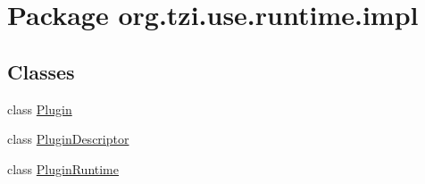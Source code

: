 \hypertarget{namespaceorg_1_1tzi_1_1use_1_1runtime_1_1impl}{\section{Package org.\-tzi.\-use.\-runtime.\-impl}
\label{namespaceorg_1_1tzi_1_1use_1_1runtime_1_1impl}
}
\subsection*{Classes}
\begin{DoxyCompactItemize}
\item 
class \hyperlink{classorg_1_1tzi_1_1use_1_1runtime_1_1impl_1_1_plugin}{Plugin}
\item 
class \hyperlink{classorg_1_1tzi_1_1use_1_1runtime_1_1impl_1_1_plugin_descriptor}{Plugin\-Descriptor}
\item 
class \hyperlink{classorg_1_1tzi_1_1use_1_1runtime_1_1impl_1_1_plugin_runtime}{Plugin\-Runtime}
\end{DoxyCompactItemize}
